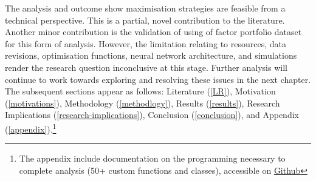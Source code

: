 The analysis and outcome show maximisation strategies are feasible from a technical perspective. This is a partial, novel contribution to the literature.
Another minor contribution is the validation of using of factor portfolio dataset for this form of analysis.
However, the limitation relating to resources, data revisions, optimisation functions, neural network architecture, and simulations render the research
question inconclusive at this stage. Further analysis will continue to work towards exploring and resolving these issues in the next chapter.
The subsequent sections appear as follows: Literature (\ref{LR}), Motivation (\ref{motivations}), Methodology (\ref{methodlogy}), 
Results (\ref{results}), Research Implications (\ref{research-implications}), Conclusion (\ref{conclusion}), and Appendix (\ref{appendix}).\footnote{The appendix include documentation on the programming necessary to complete analysis (50+ custom functions and classes), accessible on \href{https://github.com/CMCD1996/finance-honours}{Github}}

